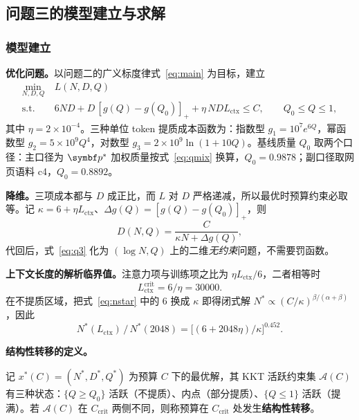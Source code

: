 \subsection{问题三的模型建立与求解}

\subsubsection{模型建立}

\textbf{优化问题。}以问题二的广义标度律式~\eqref{eq:main} 为目标，建立
\begin{equation}
\begin{aligned}
\min_{N,D,Q}\ & L(N,D,Q)\\
\text{s.t.}\ & 6ND+D\,[g(Q)-g(Q_0)]_{+}+\eta\,N D L_{\mathrm{ctx}}\le C,\qquad Q_0\le Q\le1,
\end{aligned}
\label{eq:q3}
\end{equation}
其中 $\eta=2\times10^{-4}$。三种单位 token 提质成本函数为：指数型 $g_1=10^7e^{6Q}$，幂函数型 $g_2=5\times10^9Q^4$，对数型 $g_3=2\times10^9\ln(1+10Q)$。基线质量 $Q_0$ 取两个口径：主口径为 $\bp^*$ 加权质量按式~\eqref{eq:qmix} 换算，$Q_0=0.9878$；副口径取网页语料 c4，$Q_0=0.8892$。

\textbf{降维。}三项成本都与 $D$ 成正比，而 $L$ 对 $D$ 严格递减，所以最优时预算约束必取等。记 $\kappa=6+\eta L_{\mathrm{ctx}}$、$\Delta g(Q)=[g(Q)-g(Q_0)]_+$，则
\begin{equation}
D(N,Q)=\frac{C}{\kappa N+\Delta g(Q)},
\label{eq:dsolve}
\end{equation}
代回后，式~\eqref{eq:q3} 化为 $(\log N,Q)$ 上的二维\emph{无约束}问题，不需要罚函数。

\textbf{上下文长度的解析临界值。}注意力项与训练项之比为 $\eta L_{\mathrm{ctx}}/6$，二者相等时
\begin{equation}
L_{\mathrm{ctx}}^{\mathrm{crit}}=6/\eta=30000 .
\end{equation}
在不提质区域，把式~\eqref{eq:nstar} 中的 $6$ 换成 $\kappa$ 即得闭式解 $N^*\propto(C/\kappa)^{\beta/(\alpha+\beta)}$，因此
\begin{equation}
N^*(L_{\mathrm{ctx}})\,/\,N^*(2048)=\bigl[(6+2048\eta)/\kappa\bigr]^{0.452}.
\label{eq:ctxratio}
\end{equation}

\textbf{结构性转移的定义。}
\begin{definition}[结构性转移]\label{def:st}
记 $x^*(C)=(N^*,D^*,Q^*)$ 为预算 $C$ 下的最优解，其 KKT 活跃约束集 $\mathcal A(C)$ 有三种状态：$\{Q\ge Q_0\}$ 活跃（不提质）、内点（部分提质）、$\{Q\le1\}$ 活跃（提满）。若 $\mathcal A(C)$ 在 $C_{\mathrm{crit}}$ 两侧不同，则称预算在 $C_{\mathrm{crit}}$ 处发生\textbf{结构性转移}。
\end{definition}

